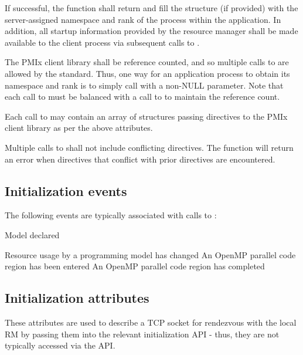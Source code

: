 If successful, the function shall return  and fill the  structure (if provided) with the server-assigned namespace and rank of the process within the application.
In addition, all startup information provided by the resource manager shall be made available to the client process via subsequent calls to .

The \ac{PMIx} client library shall be reference counted, and so multiple calls to  are allowed by the standard.
Thus, one way for an application process to obtain its namespace and rank is to simply call  with a non-NULL  parameter.
Note that each call to  must be balanced with a call to  to maintain the reference count.

Each call to  may contain an array of  structures passing directives to the \ac{PMIx} client library as per the above attributes.

Multiple calls to  shall not include conflicting directives.
The  function will return an error when directives that conflict with prior directives are encountered.

\subsection{Initialization events}

The following events are typically associated with calls to :

\begin{constantdesc}

Model declared

Resource usage by a programming model has changed
%
An OpenMP parallel code region has been entered
%
An OpenMP parallel code region has completed

\end{constantdesc}

\subsection{Initialization attributes}

These attributes are used to describe a TCP socket for rendezvous with the local \ac{RM} by passing them into the relevant initialization \ac{API} - thus, they are not typically accessed via the  \ac{API}.


